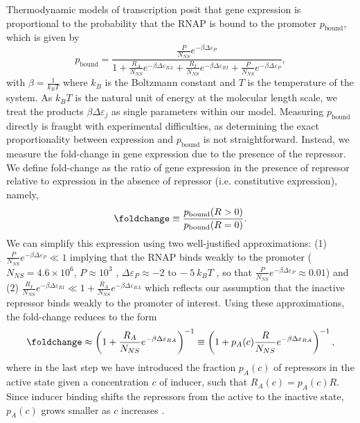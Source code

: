 Thermodynamic models of transcription \citep{Ackers1982, Buchler2003, Vilar2003,
Bintu2005, Bintu2005a, Kuhlman2007, Daber2011a, Garcia2011, Brewster2014,
Weinert2014} posit that gene expression is proportional to the probability that
the RNAP is bound to the promoter $p_{\text{bound}}$, which is given by
\begin{equation}\label{eq_p_bound_definition}
p_\text{bound}=\frac{\frac{P}{N_{NS}}e^{-\beta \Delta\varepsilon_{P}}}{1+\frac{R_A}{N_{NS}}e^{-\beta \Delta\varepsilon_{RA}}+\frac{R_I}{N_{NS}}e^{-\beta \Delta\varepsilon_{RI}}+\frac{P}{N_{NS}}e^{-\beta\Delta\varepsilon_{P}}},
\end{equation}
with $\beta = \frac{1}{k_BT}$ where $k_B$ is the Boltzmann constant and $T$ is
the temperature of the system. As $k_BT$ is the natural unit of energy at the
molecular length scale, we treat the products $\beta \Delta\varepsilon_{j}$ as
single parameters within our model. Measuring $p_{\text{bound}}$ directly is
fraught with experimental difficulties, as determining the exact proportionality between expression and $p_{\text{bound}}$ is not straightforward. Instead, we measure the
fold-change in gene expression due to the presence of the repressor. We define
fold-change as the ratio of gene expression in the presence of repressor
relative to expression in the absence of repressor (i.e. constitutive expression), namely,
\begin{equation}\label{eq_fold_change_definition}
\foldchange \equiv \frac{p_\text{bound}(R > 0)}{p_\text{bound}(R = 0)}.
\end{equation}
We can simplify this expression using two well-justified approximations: (1)
$\frac{P}{N_{NS}}e^{-\beta\Delta\varepsilon_{P}}\ll 1$ implying that the RNAP
binds weakly to the promoter ($N_{NS} = 4.6 \times 10^6$, $P \approx 10^3$
\citep{Klumpp2008}, $\Delta\varepsilon_{P} \approx -2 \,\, \text{to} \, -5~k_B
T$ \citep{Brewster2012}, so that $\frac{P}{N_{NS}}e^{-\beta\Delta\varepsilon_{P}}
\approx 0.01$) and (2) $\frac{R_I}{N_{NS}}e^{-\beta \Delta\varepsilon_{RI}} \ll
1 + \frac{R_A}{N_{NS}} e^{-\beta\Delta\varepsilon_{RA}}$ which reflects our
assumption that the inactive repressor binds weakly to the promoter of interest.
Using these approximations, the fold-change reduces to the form
\begin{equation}\label{eq_fold_change_approx}
\foldchange \approx \left(1+\frac{R_A}{N_{NS}}e^{-\beta \Delta\varepsilon_{RA}}\right)^{-1} \equiv \left( 1+p_A(c) \frac{R}{N_{NS}}e^{-\beta
	\Delta\varepsilon_{RA}} \right)^{-1},
\end{equation}
where in the last step we have introduced the fraction $p_A(c)$ of repressors in
the active state given a concentration $c$ of inducer, such that
$R_A(c)=p_A(c) R$. Since inducer binding shifts the repressors from the active
to the inactive state, $p_A(c)$ grows smaller as $c$ increases
\citep{Marzen2013}.

